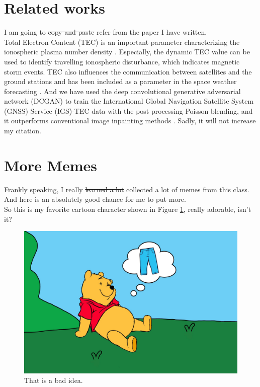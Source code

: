 \documentclass[14pt, letterpaper]{article}
\begin{document}
\newpage


\section{Related works}
I am going to \sout{copy-and-paste} refer from the paper I have written. \\
Total Electron Content (TEC) is an important parameter characterizing the ionospheric
plasma number density \citep{mannucci1998global}. Especially, the dynamic TEC value can be used
to identify travelling ionospheric disturbance, which indicates magnetic storm events. TEC also
influences the communication between satellites and the ground stations and has been included
as a parameter in the space weather forecasting \citep{jakowski2002gps,afraimovich2008tec}. 
And we have used the deep convolutional generative adversarial network (DCGAN) to train the International 
Global Navigation Satellite System (GNSS) Service (IGS)-TEC data with the post processing Poisson blending, and it outperforms conventional 
image inpainting methods \citet{pan2020tec}. Sadly, it will not increase my citation.

\newpage

\section{More Memes}
Frankly speaking, I really \sout{learned a lot} collected a lot of memes from this class. And here is an 
absolutely good chance for me to put more. \\
So this is my favorite cartoon character shown in Figure \ref{fig:pooh}, really adorable, isn't it? \\

\begin{figure}[!b]
	\begin{center}
	\includegraphics[width=12cm]{pooh_pants.png}
	\caption{That is a bad idea.}
	\label{fig:pooh}
	\end{center}
\end{figure}
\newpage
\end{document}
